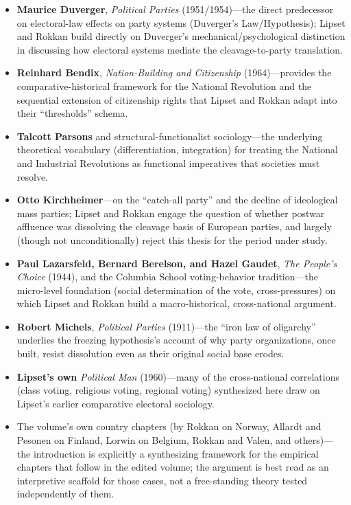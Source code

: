 \documentclass[12pt]{article}
\begin{document}
\begin{itemize}[leftmargin=*, itemsep=4pt]
    \item \textbf{Maurice Duverger}, \textit{Political Parties} (1951/1954)---the direct predecessor on electoral-law effects on party systems (Duverger's Law/Hypothesis); Lipset and Rokkan build directly on Duverger's mechanical/psychological distinction in discussing how electoral systems mediate the cleavage-to-party translation.
    \item \textbf{Reinhard Bendix}, \textit{Nation-Building and Citizenship} (1964)---provides the comparative-historical framework for the National Revolution and the sequential extension of citizenship rights that Lipset and Rokkan adapt into their ``thresholds'' schema.
    \item \textbf{Talcott Parsons} and structural-functionalist sociology---the underlying theoretical vocabulary (differentiation, integration) for treating the National and Industrial Revolutions as functional imperatives that societies must resolve.
    \item \textbf{Otto Kirchheimer}---on the ``catch-all party'' and the decline of ideological mass parties; Lipset and Rokkan engage the question of whether postwar affluence was dissolving the cleavage basis of European parties, and largely (though not unconditionally) reject this thesis for the period under study.
    \item \textbf{Paul Lazarsfeld, Bernard Berelson, and Hazel Gaudet}, \textit{The People's Choice} (1944), and the Columbia School voting-behavior tradition---the micro-level foundation (social determination of the vote, cross-pressures) on which Lipset and Rokkan build a macro-historical, cross-national argument.
    \item \textbf{Robert Michels}, \textit{Political Parties} (1911)---the ``iron law of oligarchy'' underlies the freezing hypothesis's account of why party organizations, once built, resist dissolution even as their original social base erodes.
    \item \textbf{Lipset's own} \textit{Political Man} (1960)---many of the cross-national correlations (class voting, religious voting, regional voting) synthesized here draw on Lipset's earlier comparative electoral sociology.
    \item The volume's own country chapters (by Rokkan on Norway, Allardt and Pesonen on Finland, Lorwin on Belgium, Rokkan and Valen, and others)---the introduction is explicitly a synthesizing framework for the empirical chapters that follow in the edited volume; the argument is best read as an interpretive scaffold for those cases, not a free-standing theory tested independently of them.
\end{itemize}
\end{document}
